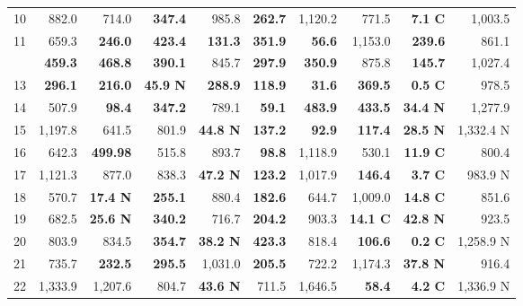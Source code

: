 \documentclass[10pt]{reportMaster}
\begin{document}
\begin{table}[t]
\begin{threeparttable}
{\begin{tabular}{@{}r r r r r r r r r r@{}}
10
& 882.0 & 714.0 & \textbf{347.4}
& 985.8 & \textbf{262.7} & 1,120.2
& 771.5 & \textbf{7.1 C} & 1,003.5 \\

11
& 659.3 & \textbf{246.0} & \textbf{423.4}
& \textbf{131.3} & \textbf{351.9} & \textbf{56.6}
& 1,153.0 & \textbf{239.6} & 861.1 \\

\addlinespace
12
& \textbf{459.3} & \textbf{468.8} & \textbf{390.1}
& 845.7 & \textbf{297.9} & \textbf{350.9}
& 875.8 & \textbf{145.7} & 1,027.4 \\

13
& \textbf{296.1} & \textbf{216.0} & \textbf{45.9 N}
& \textbf{288.9} & \textbf{118.9} & \textbf{31.6}
& \textbf{369.5} & \textbf{0.5 C} & 978.5 \\

14
& 507.9 & \textbf{98.4} & \textbf{347.2}
& 789.1 & \textbf{59.1} & \textbf{483.9}
& \textbf{433.5} & \textbf{34.4 N} & 1,277.9 \\

15
& 1,197.8 & 641.5 & 801.9
& \textbf{44.8 N} & \textbf{137.2} & \textbf{92.9}
& \textbf{117.4} & \textbf{28.5 N} & 1,332.4 N \\

16
& 642.3 & \textbf{499.98} & 515.8
& 893.7 & \textbf{98.8} & 1,118.9
& 530.1 & \textbf{11.9 C} & 800.4 \\

17
& 1,121.3 & 877.0 & 838.3
& \textbf{47.2 N} & \textbf{123.2} & 1,017.9
& \textbf{146.4} & \textbf{3.7 C} & 983.9 N \\

18
& 570.7 & \textbf{17.4 N} & \textbf{255.1}
& 880.4 & \textbf{182.6} & 644.7
& 1,009.0 & \textbf{14.8 C} & 851.6 \\

19
& 682.5 & \textbf{25.6 N} & \textbf{340.2}
& 716.7 & \textbf{204.2} & 903.3
& \textbf{14.1 C} & \textbf{42.8 N} & 923.5 \\

20
& 803.9 & 834.5 & \textbf{354.7}
& \textbf{38.2 N} & \textbf{423.3} & 818.4
& \textbf{106.6} & \textbf{0.2 C} & 1,258.9 N \\

21
& 735.7 & \textbf{232.5} & \textbf{295.5}
& 1,031.0 & \textbf{205.5} & 722.2
& 1,174.3 & \textbf{37.8 N} & 916.4 \\

22
& 1,333.9 & 1,207.6 & 804.7
& \textbf{43.6 N} & 711.5 & 1,646.5
& \textbf{58.4} & \textbf{4.2 C} & 1,336.9 N \\


\end{tabular}}
\end{threeparttable}
\end{table}
\end{document}
